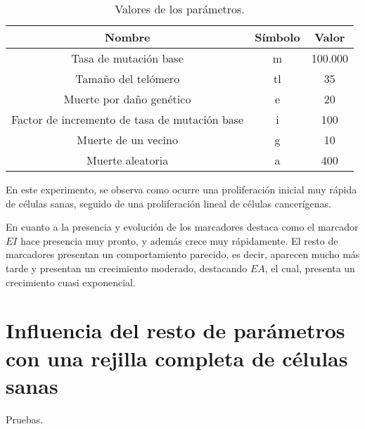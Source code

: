 \begin{table}[h!]
  \centering
  \caption{Valores de los parámetros.}
  \label{tab:table1}
  \begin{tabular}{ccc}
    \toprule
    Nombre & Símbolo & Valor\\
    \midrule
    Tasa de mutación base & m & 100.000\\
    Tamaño del telómero & tl & 35\\
    Muerte por daño genético & e & 20\\
    Factor de incremento de tasa de mutación base & i & 100\\
    Muerte de un vecino & g & 10\\
    Muerte aleatoria & a & 400\\
    \bottomrule
  \end{tabular}
\end{table}

En este experimento, se observa como ocurre una proliferación inicial muy rápida
de células sanas, seguido de una proliferación lineal de células cancerígenas.

En cuanto a la presencia y evolución de los marcadores destaca como el marcador $EI$ hace
presencia muy pronto, y además crece muy rápidamente. El resto de marcadores presentan un
comportamiento parecido, es decir, aparecen mucho más tarde y presentan un crecimiento moderado,
destacando $EA$, el cual, presenta un crecimiento cuasi exponencial.

\section{Influencia del resto de parámetros con una rejilla completa de células sanas}

Pruebas.
